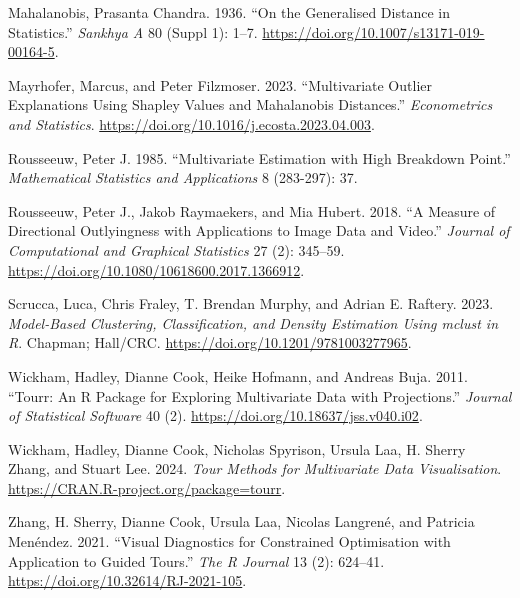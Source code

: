 \documentclass[
  12pt,
]{interact}
\newlength{\cslhangindent}
\newenvironment{CSLReferences}[2] %
 {\begin{list}{}{%
  \setlength{\itemindent}{0pt}
  \setlength{\leftmargin}{0pt}
  \setlength{\parsep}{0pt}
  \ifodd #1
   \setlength{\leftmargin}{\cslhangindent}
   \setlength{\itemindent}{-1\cslhangindent}
  \fi
  \setlength{\itemsep}{#2\baselineskip}}}
 {\end{list}}
\begin{document}
\begin{CSLReferences}{1}{0}
Mahalanobis, Prasanta Chandra. 1936. {``On the Generalised Distance in
Statistics.''} \emph{Sankhya A} 80 (Suppl 1): 1--7.
\url{https://doi.org/10.1007/s13171-019-00164-5}.

Mayrhofer, Marcus, and Peter Filzmoser. 2023. {``Multivariate Outlier
Explanations Using Shapley Values and Mahalanobis Distances.''}
\emph{Econometrics and Statistics}.
\url{https://doi.org/10.1016/j.ecosta.2023.04.003}.

Rousseeuw, Peter J. 1985. {``Multivariate Estimation with High Breakdown
Point.''} \emph{Mathematical Statistics and Applications} 8 (283-297):
37.

Rousseeuw, Peter J., Jakob Raymaekers, and Mia Hubert. 2018. {``A
Measure of Directional Outlyingness with Applications to Image Data and
Video.''} \emph{Journal of Computational and Graphical Statistics} 27
(2): 345--59. \url{https://doi.org/10.1080/10618600.2017.1366912}.

Scrucca, Luca, Chris Fraley, T. Brendan Murphy, and Adrian E. Raftery.
2023. \emph{Model-Based Clustering, Classification, and Density
Estimation Using {mclust} in {R}}. Chapman; Hall/CRC.
\url{https://doi.org/10.1201/9781003277965}.

Wickham, Hadley, Dianne Cook, Heike Hofmann, and Andreas Buja. 2011.
{``Tourr: {An} {R} {Package} for {Exploring} {Multivariate} {Data} with
{Projections}.''} \emph{Journal of Statistical Software} 40 (2).
\url{https://doi.org/10.18637/jss.v040.i02}.

Wickham, Hadley, Dianne Cook, Nicholas Spyrison, Ursula Laa, H. Sherry
Zhang, and Stuart Lee. 2024. \emph{Tour Methods for Multivariate Data
Visualisation}. \url{https://CRAN.R-project.org/package=tourr}.

Zhang, H. Sherry, Dianne Cook, Ursula Laa, Nicolas Langrené, and
Patricia Menéndez. 2021. {``Visual Diagnostics for Constrained
Optimisation with Application to Guided Tours.''} \emph{The R Journal}
13 (2): 624--41. \url{https://doi.org/10.32614/RJ-2021-105}.

\end{CSLReferences}
\end{document}

